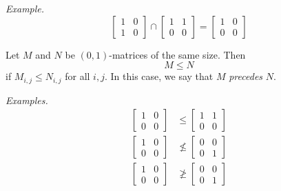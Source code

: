 \documentclass[11pt]{article}
\begin{document}
    \vspace{1em}

    \emph{Example.}
    \begin{equation*}
        \begin{bmatrix}
            1 & 0 \\ 1 & 0
        \end{bmatrix} \cap \begin{bmatrix}
                                1 & 1 \\ 0 & 0
                            \end{bmatrix} = \begin{bmatrix}
                                                1 & 0 \\ 0 & 0
                                            \end{bmatrix}
    \end{equation*}
 
    \vspace{1em}

    Let $M$ and $N$ be \((0,1)\)-matrices of the same size. Then \[M \leq N\] if \(M_{i,j} \leq N_{i,j}\) for all \(i,j\). In this case, we say that $M$ \emph{precedes} $N$.

    \vspace{1em}

    \emph{Examples.}
    \begin{align*}
        \begin{bmatrix}
            1 & 0 \\ 0 & 0
        \end{bmatrix} &\leq \begin{bmatrix}
                                1 & 1 \\ 0  & 0
                            \end{bmatrix} \\
        \begin{bmatrix}
            1 & 0 \\ 0 & 0
        \end{bmatrix} &\nleq \begin{bmatrix}
                                0 & 0 \\ 0 & 1
                            \end{bmatrix} \\
        \begin{bmatrix}
            1 & 0 \\ 0 & 0
        \end{bmatrix} &\ngeq \begin{bmatrix}
                                0 & 0 \\ 0 & 1
                            \end{bmatrix}
    \end{align*}
\end{document}
